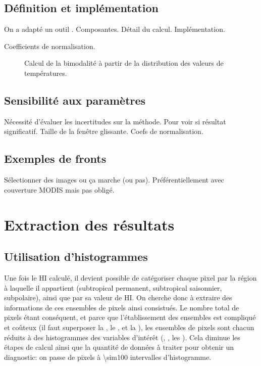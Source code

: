 \documentclass[index]{subfiles}
\begin{document}
\subsection{Définition et implémentation}
\label{sec:HI-definition}

On a adapté un outil \parencite{liu_2016}.
Composantes.
Détail du calcul.
Implémentation.

Coefficients de normalisation.

\begin{figure}
  \centering
  \caption[Calcul de la bimodalité]{Calcul de la bimodalité à partir de la distribution des valeurs de températures.}
  \label{fig:bimodality}
\end{figure}

\subsection{Sensibilité aux paramètres}
\label{sec:HI-sensibilite}

Nécessité d'évaluer les incertitudes sur la méthode.
Pour voir si résultat significatif.
Taille de la fenêtre glissante. Coefs de normalisation.

\subsection{Exemples de fronts}
\label{sec:HI-exemples}

Sélectionner des images ou ça marche (ou pas).
Préférentiellement avec couverture MODIS mais pas obligé.

\section{Extraction des résultats}
\label{sec:extraction-res}

\subsection{Utilisation d'histogrammes}
\label{sec:extraction-hist}

Une fois le HI calculé, il devient possible de catégoriser chaque pixel par la région à laquelle il appartient (subtropical permanent, subtropical saisonnier, subpolaire), ainsi que par sa valeur de HI\@.
On cherche donc à extraire des informations de ces ensembles de pixels ainsi consistués.
Le nombre total de pixels étant conséquent, et parce que l'établissement des ensembles est compliqué et coûteux (il faut superposer la , le , et la ), les ensembles de pixels sont chacun réduits à des histogrammes des variables d'intérêt (, , les ).
Cela diminue les étapes de calcul ainsi que la quantité de données à traiter pour obtenir un diagnostic: on passe de  pixels à \num{\sim100} intervalles d'histogramme.
\end{document}
